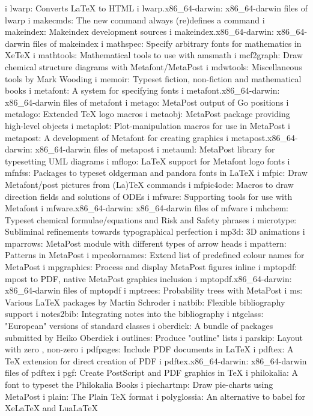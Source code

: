 i lwarp: Converts LaTeX to HTML
i lwarp.x86_64-darwin: x86_64-darwin files of lwarp
i makecmds: The new \makecommand command always (re)defines a command
i makeindex: Makeindex development sources
i makeindex.x86_64-darwin: x86_64-darwin files of makeindex
i mathspec: Specify arbitrary fonts for mathematics in XeTeX
i mathtools: Mathematical tools to use with amsmath
i mcf2graph: Draw chemical structure diagrams with Metafont/MetaPost
i mdwtools: Miscellaneous tools by Mark Wooding
i memoir: Typeset fiction, non-fiction and mathematical books
i metafont: A system for specifying fonts
i metafont.x86_64-darwin: x86_64-darwin files of metafont
i metago: MetaPost output of Go positions
i metalogo: Extended TeX logo macros
i metaobj: MetaPost package providing high-level objects
i metaplot: Plot-manipulation macros for use in MetaPost
i metapost: A development of Metafont for creating graphics
i metapost.x86_64-darwin: x86_64-darwin files of metapost
i metauml: MetaPost library for typesetting UML diagrams
i mflogo: LaTeX support for Metafont logo fonts
i mfnfss: Packages to typeset oldgerman and pandora fonts in LaTeX
i mfpic: Draw Metafont/post pictures from (La)TeX commands
i mfpic4ode: Macros to draw direction fields and solutions of ODEs
i mfware: Supporting tools for use with Metafont
i mfware.x86_64-darwin: x86_64-darwin files of mfware
i mhchem: Typeset chemical formulae/equations and Risk and Safety phrases
i microtype: Subliminal refinements towards typographical perfection
i mp3d: 3D animations
i mparrows: MetaPost module with different types of arrow heads
i mpattern: Patterns in MetaPost
i mpcolornames: Extend list of predefined colour names for MetaPost
i mpgraphics: Process and display MetaPost figures inline
i mptopdf: mpost to PDF, native MetaPost graphics inclusion
i mptopdf.x86_64-darwin: x86_64-darwin files of mptopdf
i mptrees: Probability trees with MetaPost
i ms: Various LaTeX packages by Martin Schroder
i natbib: Flexible bibliography support
i notes2bib: Integrating notes into the bibliography
i ntgclass: "European" versions of standard classes
i oberdiek: A bundle of packages submitted by Heiko Oberdiek
i outlines: Produce "outline" lists
i parskip: Layout with zero \parindent, non-zero \parskip
i pdfpages: Include PDF documents in LaTeX
i pdftex: A TeX extension for direct creation of PDF
i pdftex.x86_64-darwin: x86_64-darwin files of pdftex
i pgf: Create PostScript and PDF graphics in TeX
i philokalia: A font to typeset the Philokalia Books
i piechartmp: Draw pie-charts using MetaPost
i plain: The Plain TeX format
i polyglossia: An alternative to babel for XeLaTeX and LuaLaTeX
